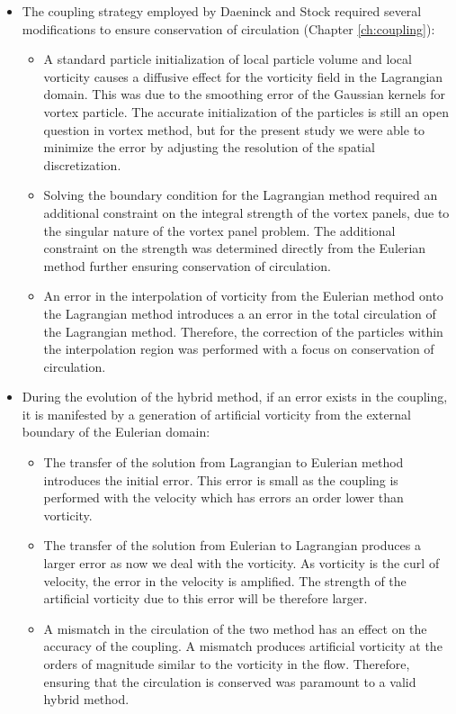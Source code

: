 \begin{itemize}

\item The coupling strategy employed by Daeninck and Stock required several modifications to ensure conservation of circulation (Chapter \ref{ch:coupling}):
	\begin{itemize}
	\item A standard particle initialization of local particle volume and local vorticity causes a diffusive effect for the vorticity field in the Lagrangian domain. This was due to the smoothing error of the Gaussian kernels for vortex particle. The accurate initialization of the particles is still an open question in vortex method, but for the present study we were able to minimize the error by adjusting the resolution of the spatial discretization. 

	\item Solving the boundary condition for the Lagrangian method required an additional constraint on the integral strength of the vortex panels, due to the singular nature of the vortex panel problem.  The additional constraint on the strength was determined directly from the Eulerian method further ensuring conservation of circulation.
	
	\item An error in the interpolation of vorticity from the Eulerian method onto the Lagrangian method introduces a an error in the total circulation of the Lagrangian method. Therefore, the correction of the particles within the interpolation region was performed with a focus on conservation of circulation.
	\end{itemize}
	
\item During the evolution of the hybrid method, if an error exists in the coupling, it is manifested by a generation of artificial vorticity from the external boundary of the Eulerian domain:
	\begin{itemize}
	\item The transfer of the solution from Lagrangian to Eulerian method introduces the initial error. This error is small as the coupling is performed with the velocity which has errors an order lower than vorticity.
	\item The transfer of the solution from Eulerian to Lagrangian produces a larger error as now we deal with the vorticity. As vorticity is the curl of velocity, the error in the velocity is amplified. The strength of the artificial vorticity due to this error will be therefore larger.
	\item A mismatch in the circulation of the two method has an effect on the accuracy of the coupling. A mismatch produces artificial vorticity at the orders of magnitude similar to the vorticity in the flow. Therefore, ensuring that the circulation is conserved was paramount to a valid hybrid method.
	\end{itemize}



\end{itemize}
